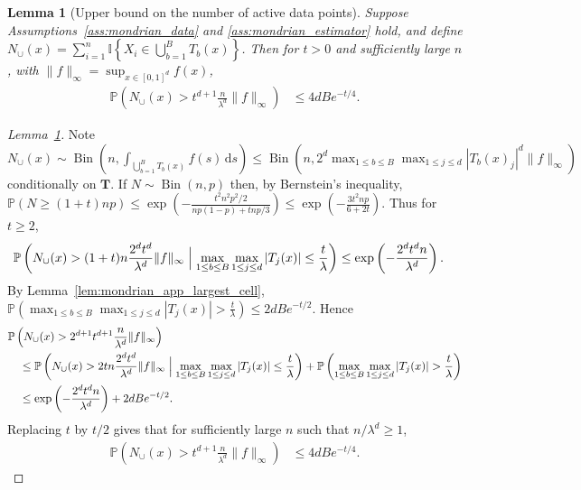 \documentclass[11pt,lof]{puthesis}
\renewcommand{\P}{\ensuremath{\mathbb{P}}}
\newcommand{\I}{\ensuremath{\mathbb{I}}}
\newcommand{\bT}{\ensuremath{\mathbf{T}}}
\DeclareMathOperator{\Bin}{Bin}
\newcommand{\diff}[1]{\,\mathrm{d}#1}
\theoremstyle{break}
\newtheorem{lemma}{Lemma}[section]
\theoremstyle{proof}
\newtheorem{proof}{Proof}
\begin{document}
\begin{lemma}[Upper bound on the number of active data points]%
  \label{lem:mondrian_app_active_data}
  Suppose Assumptions~\ref{ass:mondrian_data} and \ref{ass:mondrian_estimator}
  hold,
  and define
  $N_{\cup}(x) =
  \sum_{i=1}^{n} \I \left\{ X_i \in \bigcup_{b=1}^{B} T_b(x) \right\}$.
  Then for $t > 0$ and sufficiently large $n$,
  with $\|f\|_\infty = \sup_{x \in [0,1]^d} f(x)$,
  \begin{align*}
    \P \left( N_{\cup}(x) > t^{d+1}
      \frac{n}{\lambda^d}
      \|f\|_\infty
    \right)
    &\leq
    4 d B e^{-t/4}.
  \end{align*}
\end{lemma}

\begin{proof}[Lemma~\ref{lem:mondrian_app_active_data}]

  Note
  $N_\cup(x) \sim
  \Bin\left(n, \int_{\bigcup_{b=1}^{B} T_b(x)} f(s) \diff s \right)
  \leq \Bin\left(n, 2^d \max_{1 \leq b \leq B} \max_{1 \leq j \leq d}
  |T_b(x)_j|^d \|f\|_\infty \right)$
  conditionally on $\bT$.
  If $N \sim \Bin(n,p)$ then, by Bernstein's inequality,
  $\P\left( N \geq (1 + t) n p\right)
  \leq \exp\left(-\frac{t^2 n^2 p^2 / 2}{n p(1-p) + t n p / 3}\right)
  \leq \exp\left(-\frac{3t^2 n p}{6 + 2t}\right)$.
  Thus for $t \geq 2$,
  \begin{align*}
    \P \left( N_{\cup}(x) > (1+t) n \frac{2^d t^d}{\lambda^d}
      \|f\|_\infty
      \Bigm| \max_{1 \leq b \leq B} \max_{1 \leq j \leq d}
      |T_j(x)| \leq \frac{t}{\lambda}
    \right)
    &\leq
    \exp\left(- \frac{2^d t^{d} n}{\lambda^d}\right).
  \end{align*}
  By Lemma~\ref{lem:mondrian_app_largest_cell},
  $\P \left( \max_{1 \leq b \leq B} \max_{1 \leq j \leq d}
  |T_j(x)| > \frac{t}{\lambda} \right)
  \leq 2 d B e^{-t/2}$.
  Hence
  \begin{align*}
    &\P \left( N_{\cup}(x) > 2^{d+1} t^{d+1} \frac{n}{\lambda^d}
      \|f\|_\infty
    \right) \\
    &\quad\leq
    \P \left( N_{\cup}(x) > 2 t n \frac{2^d t^d}{\lambda^d}
      \|f\|_\infty
      \Bigm| \max_{1 \leq b \leq B} \max_{1 \leq j \leq d}
      |T_j(x)| \leq \frac{t}{\lambda}
    \right)
    + \P \left( \max_{1 \leq b \leq B} \max_{1 \leq j \leq d}
      |T_j(x)| > \frac{t}{\lambda}
    \right) \\
    &\quad\leq
    \exp\left(- \frac{2^d t^{d} n}{\lambda^d}\right)
    + 2 d B e^{-t/2}.
  \end{align*}
  Replacing $t$ by $t/2$ gives that for sufficiently large $n$ such that
  $n / \lambda^d \geq 1$,
  \begin{align*}
    \P \left( N_{\cup}(x) > t^{d+1}
      \frac{n}{\lambda^d}
      \|f\|_\infty
    \right)
    &\leq
    4 d B e^{-t/4}.
  \end{align*}
\end{proof}
\end{document}
